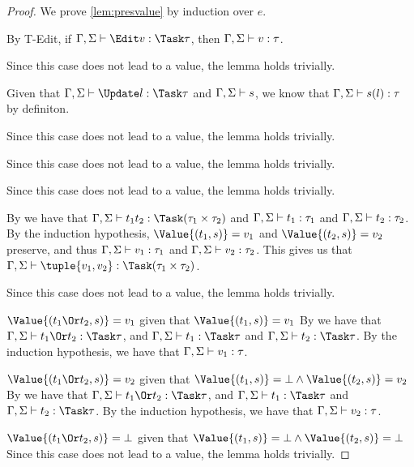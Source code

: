 \begin{proof}
  We prove \cref{lem:presvalue} by induction over $e$.

      {By T-Edit, if $\Gamma,\Sigma\infers \Edit v:\Task\tau$, then $\Gamma,\Sigma\vdash v:\tau$.}

      {Since this case does not lead to a value, the lemma holds trivially.}

      {Given that $\Gamma,\Sigma\infers\Update l:\Task \tau$ and $\Gamma,\Sigma\vdash s$,
      we know that $\Gamma,\Sigma\vdash s(l):\tau$ by definiton.}

      {Since this case does not lead to a value, the lemma holds trivially.}

      { Since this case does not lead to a value, the lemma holds trivially.}

      {Since this case does not lead to a value, the lemma holds trivially.}

      {By  we have that $\Gamma,\Sigma\infers t_1\And t_2:\Task(\tau_1\times\tau_2)$ and $\Gamma,\Sigma\vdash t_1:\tau_1$ and $\Gamma,\Sigma\vdash t_2:\tau_2$.
      By the induction hypothesis, $ \Value{(t_1,s)}=v_1$ and $\Value{(t_2,s)}=v_2$ preserve, and thus $\Gamma,\Sigma\vdash v_1:\tau_1$ and $\Gamma,\Sigma\vdash v_2:\tau_2$.
      This gives us that $\Gamma,\Sigma\infers \tuple{v_1, v_2}:\Task(\tau_1\times\tau_2)$.}

      { Since this case does not lead to a value, the lemma holds trivially.}

\case
{$\Value{(t_1\Or t_2,s)}=v_1$ given that
  $\Value{(t_1,s)}=v_1$}{
  By  we have that $\Gamma,\Sigma\infers t_1\Or t_2:\Task\tau$,
  and $\Gamma,\Sigma\infers t_1:\Task\tau$ and
  $\Gamma,\Sigma\infers t_2:\Task\tau$. By the induction hypothesis, we have
  that $\Gamma,\Sigma\vdash v_1:\tau$.}

\case
{$\Value{(t_1\Or t_2,s)}=v_2$ given that
  $\Value{(t_1,s)}=\bot\wedge\Value{(t_2,s)}=v_2$}{
  By  we have that $\Gamma,\Sigma\infers t_1\Or t_2:\Task\tau$,
  and $\Gamma,\Sigma\infers t_1:\Task\tau$ and
  $\Gamma,\Sigma\infers t_2:\Task\tau$. By the induction hypothesis, we have
  that $\Gamma,\Sigma\vdash v_2:\tau$.}

\case
{$\Value{(t_1\Or t_2,s)}=\bot$ given that
  $\Value{(t_1,s)}=\bot\wedge\Value{(t_2,s)}=\bot$}{ Since this case does not
  lead to a value, the lemma holds trivially.}


\end{proof}



